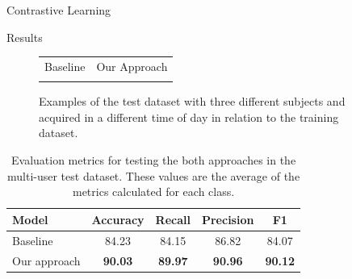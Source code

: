 \documentclass[final]{beamer}
\newlength{\colwidth}
\begin{document}
\begin{frame}[t]
\begin{columns}[t]
\begin{column}{\colwidth}
\begin{exampleblock}{Contrastive Learning}
  \end{exampleblock}
  \begin{block}{Results}

    \def\globalCMscale{1.9}

    \begin{figure}[!ht]
      \justify
      \centering
      \def\vsTW{0.2\textwidth}  %
      \setlength{\tabcolsep}{2pt} %
      \newcommand{\vsTE}[1]{\texttt{[image: gestures/\#1.png]}}
      \begin{tabular}{cc}
      \hspace{25mm} Baseline & \hspace{17mm} Our Approach \\
       &  \\
      \end{tabular}
      \caption{Examples of the test dataset with three different subjects and acquired in a different time of day in relation to the training dataset.\label{fig:gestures_test}}
    \end{figure}

    \begin{table}[!ht] 
      \centering
      \begin{tabular}{lcccc}
        \toprule
        \textbf{Model}	& \textbf{Accuracy}	& \textbf{Recall} & \textbf{Precision} & \textbf{F1}\\
        \midrule
        Baseline & 84.23	& 84.15 & 86.82 & 84.07\\
        Our approach & \textbf{90.03} & \textbf{89.97} & \textbf{90.96} & \textbf{90.12} \\
        \bottomrule
      \end{tabular}
      \caption{Evaluation metrics for testing the both approaches in the multi-user test dataset. These values are the average of the metrics calculated for each class.\label{tab:metrics}}
      \end{table}


\end{block}
\end{column}
\end{columns}
\end{frame}
\end{document}
